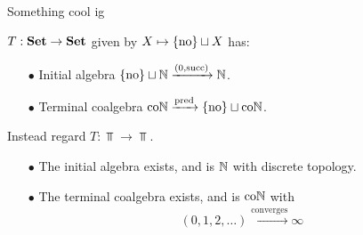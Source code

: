 
\begin{frame}{Something cool ig} %
  
  \par $T : \operatorname{\mathbf{Set}} \to \operatorname{\mathbf{Set}}$ given by $X \mapsto \{\mathrm{no}\} \sqcup X$ has:

  \begin{itemize}
    \item[$\bullet$] {
      Initial algebra $\{\mathrm{no}\} \sqcup \mathbb{N} \xrightarrow{(0, \operatorname{succ})} \mathbb{N}$.
    }
    \item[$\bullet$] {
      Terminal coalgebra $\mathrm{co}\mathbb{N} \xrightarrow{\operatorname{pred}} \{\mathrm{no}\} \sqcup \mathrm{co}\mathbb{N}$.
    }
  \end{itemize}

  \vspace{1.5 \baselineskip}

  \pause

  \par Instead regard $T : \Top \to \Top$.
  \vspace{0.5 \baselineskip}

  \pause

  \begin{itemize}
    \item[$\bullet$] {
      The initial algebra exists, and is $\mathbb{N}$ with discrete topology.
    }\pause
    \item[$\bullet$] {
      The terminal coalgebra exists, and is $\mathrm{co}\mathbb{N}$ with
      \begin{align*}
        (0, 1, 2, \dots) \xrightarrow{\text{converges}} \infty
      \end{align*}
    }
  \end{itemize}

\end{frame}
